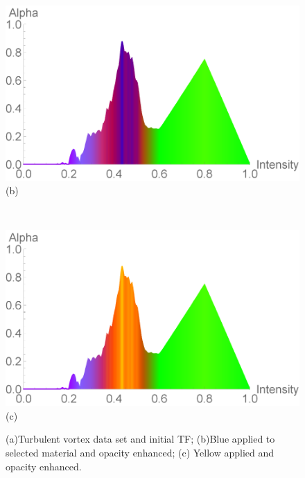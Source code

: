 \documentclass[twoside,twocolumn,10pt]{article}
\begin{document}
\begin{figure}
	\begin{minipage}{.16\textwidth}
		\centering
		\includegraphics[width=.91\linewidth]{tf_vortex_2_blue}
		(b)%
		\label{fig:tf_vortex_2_blue}
	\end{minipage}~
	\begin{minipage}{.16\textwidth}
		\centering
		\includegraphics[width=.91\linewidth]{tf_vortex_2_yellow}
		(c)%
		\label{fig:tf_vortex_2_yellow}
	\end{minipage}
	\caption{(a)Turbulent vortex data set and initial TF; (b)Blue applied to selected material and opacity enhanced; (c) Yellow applied and opacity enhanced.}
	\label{fig:Vortex_all}
\end{figure}
\end{document}
